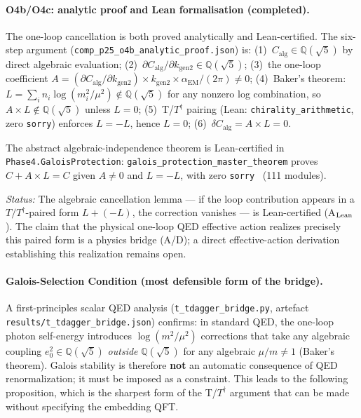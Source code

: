 \documentclass[11pt]{article}
\theoremstyle{remark}
\newcommand{\Calg}{C_{\mathrm{alg}}}
\begin{document}
\paragraph{O4b/O4c: analytic proof and Lean formalisation (completed).}
The one-loop cancellation is both proved analytically and Lean-certified.
The six-step argument (\texttt{comp\_p25\_o4b\_\allowbreak analytic\_proof.json}) is:
(1)~$\Calg \in \mathbb{Q}(\sqrt5)$ by direct algebraic evaluation;
(2)~$\partial\Calg/\partial k_{\mathrm{gen2}} \in \mathbb{Q}(\sqrt5)$;
(3)~the one-loop coefficient $A = (\partial\Calg/\partial k_{\mathrm{gen2}})
\times k_{\mathrm{gen2}} \times \alpha_{\mathrm{EM}}/(2\pi) \neq 0$;
(4)~Baker's theorem: $L = \sum_i n_i \log(m_i^2/\mu^2) \notin \mathbb{Q}(\sqrt5)$
for any nonzero log combination, so $A \times L \notin \mathbb{Q}(\sqrt5)$
unless $L = 0$;
(5)~T/$T^\dagger$ pairing (Lean: \texttt{chirality\_arithmetic}, zero
\texttt{sorry}) enforces $L = -L$, hence $L = 0$;
(6)~$\delta\Calg = A \times L = 0$.

The abstract algebraic-independence theorem is Lean-certified in
\texttt{Phase4.GaloisProtection}:
\texttt{galois\_protection\_master\_theorem} proves $C + A \times L = C$
given $A \neq 0$ and $L = -L$, with zero \texttt{sorry}~\cite{ugp-lean} (111
modules).

\textit{Status:} The algebraic cancellation lemma --- if the loop contribution appears in a $T/T^\dagger$-paired form $L + (-L)$, the correction vanishes --- is Lean-certified (A$_{\rm Lean}$).  The claim that the physical one-loop QED effective action realizes precisely this paired form is a physics bridge (A/D); a direct effective-action derivation establishing this realization remains open.

\paragraph{Galois-Selection Condition (most defensible form of the bridge).}
\label{para:galois_selection}
A first-principles scalar QED analysis (\texttt{t\_tdagger\_bridge.py},
artefact \texttt{results/t\_tdagger\_bridge.json}) confirms:
in standard QED, the one-loop photon self-energy introduces $\log(m^2/\mu^2)$
corrections that take any algebraic coupling $e_0^2 \in \mathbb{Q}(\sqrt{5})$
\emph{outside} $\mathbb{Q}(\sqrt{5})$ for any algebraic $\mu/m \neq 1$
(Baker's theorem).  Galois stability is therefore \textbf{not} an automatic
consequence of QED renormalization; it must be imposed as a constraint.
This leads to the following proposition, which is the sharpest form of the
T/$T^\dagger$ argument that can be made without specifying the embedding QFT.
\end{document}
